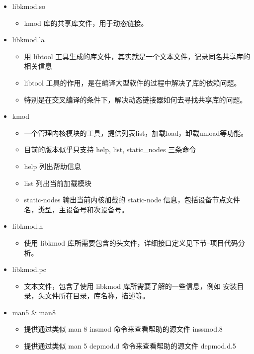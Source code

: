 \documentclass[11pt,a4paper]{article}
\begin{document}
\begin{itemize}
\item
  libkmod.so
  \begin{itemize}
  \item
    kmod 库的共享库文件，用于动态链接。
  \end{itemize}
\item
  libkmod.la
  \begin{itemize}
  \item
    用 libtool
    工具生成的库文件，其实就是一个文本文件，记录同名共享库的相关信息
  \item
    libtool 工具的作用，是在编译大型软件的过程中解决了库的依赖问题。
  \item
    特别是在交叉编译的条件下，解决动态链接器如何去寻找共享库的问题。
  \end{itemize}
\item
  kmod
  \begin{itemize}
  \item
    一个管理内核模块的工具，提供列表list，加载load，卸载unload等功能。
  \item
    目前的版本似乎只支持 help, list, static\_nodes 三条命令
  \item
    help 列出帮助信息
  \item
    list 列出当前加载模块
  \item
    static-nodes 输出当前内核加载的 static-node
    信息，包括设备节点文件名，类型，主设备号和次设备号。
  \end{itemize}
\item
  libkmod.h
  \begin{itemize}
  \item
    使用 libkmod 库所需要包含的头文件，详细接口定义见下节--项目代码分析。
  \end{itemize}
\item
  libkmod.pc
  \begin{itemize}
  \item
    文本文件，包含了使用 libkmod 库所需要了解的一些信息，例如
    安装目录，头文件所在目录，库名称，描述等。
  \end{itemize}
\item
  man5 \& man8
  \begin{itemize}
  \item
    提供通过类似 man 8 insmod 命令来查看帮助的源文件 inssmod.8
  \item
    提供通过类似 man 5 depmod.d 命令来查看帮助的源文件 depmod.d.5
  \end{itemize}
\end{itemize}
\end{document}
